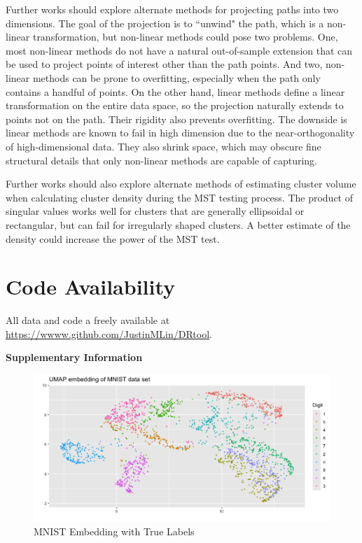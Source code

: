 \documentclass{article}
\begin{document}
{Further works should explore alternate methods for projecting paths into two dimensions. The goal of the projection is to ``unwind" the path, which is a non-linear transformation, but non-linear methods could pose two problems. One, most non-linear methods do not have a natural out-of-sample extension that can be used to project points of interest other than the path points. And two, non-linear methods can be prone to overfitting, especially when the path only contains a handful of points. On the other hand, linear methods define a linear transformation on the entire data space, so the projection naturally extends to points not on the path. Their rigidity also prevents overfitting. The downside is linear methods are known to fail in high dimension due to the near-orthogonality of high-dimensional data. They also shrink space, which may obscure fine structural details that only non-linear methods are capable of capturing.

Further works should also explore alternate methods of estimating cluster volume when calculating cluster density during the MST testing process. The product of singular values works well for clusters that are generally ellipsoidal or rectangular, but can fail for irregularly shaped clusters. A better estimate of the density could increase the power of the MST test.

\section{Code Availability}
All data and code a freely available at \url{https://wwww.github.com/JustinMLin/DRtool}.

\newpage




\newpage


\clearpage
\begin{center}
\textbf{\large Supplementary Information}
\end{center}

\setcounter{section}{0}
\setcounter{figure}{0}
\renewcommand{\thesection}{S\Roman{section}}
\renewcommand{\thefigure}{S\arabic{figure}}

\begin{figure}[H]
\centering
\includegraphics[scale=0.42]{MNIST real}
\caption{MNIST Embedding with True Labels}
\end{figure}

}
\end{document}
